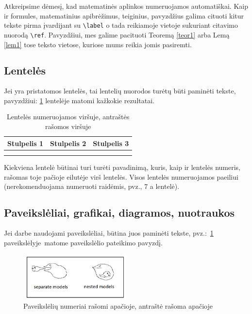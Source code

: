 \documentclass[]{VUMIFTemplateClass}
\begin{document}
    \bigskip

    Atkreipsime dėmesį, kad matematinės aplinkos numeruojamos automatiškai. Kaip ir formules, matematinius apibrėžimus, teiginius, pavyzdžius galima cituoti kitur tekste pirma įvardijant su \texttt{\textbackslash label} o tada reikiamoje vietoje sukuriant citavimo nuorodą \texttt{\textbackslash ref}. Pavyzdžiui, mes galime pacituoti Teoremą \ref{teor1} arba Lemą \ref{lem1} tose teksto vietose, kuriose mums reikia jomis pasiremti.

\subsection{Lentelės}

Jei yra pristatomos lentelės, tai lentelių nuorodos turėtų būti paminėti tekste, pavyzdžiui: \ref{tab:xydata} lentelėje matomi kažkokie rezultatai.

\begin{table}[H]
    \centering
    \caption{Lentelės numeruojamos viršuje, antraštės rašomos viršuje}
    \begin{tabular}{|c|c|c|}
        \hline
        Stulpelis 1 & Stulpelis 2 & Stulpelis 3 \\
        \hline
         & &  \\
         \hline
         & & \\
         \hline
    \end{tabular}
    \label{tab:xydata}
\end{table}


Kiekviena lentelė būtinai turi turėti pavadinimą, kuris, kaip ir lentelės numeris, rašomas toje pačioje eilutėje virš lentelės. Visos lentelės numeruojamos paeiliui (nerekomenduojama numeruoti raidėmis, pvz., 7 a lentelė).

\subsection{Paveikslėliai, grafikai, diagramos, nuotraukos}
Jei darbe naudojami paveikslėliai, būtina juos paminėti tekste, pvz.:~\ref{fig:grafikas1} paveikslėlyje~matome paveikslėlio pateikimo pavyzdį.

\begin{figure}[H]
    \centering
    \includegraphics[width=0.5\textwidth]{images/AIC.png}
    \caption{Paveikslėlių numeriai rašomi apačioje, antraštė rašoma apačioje}
    \label{fig:grafikas1}
\end{figure}
\end{document}
